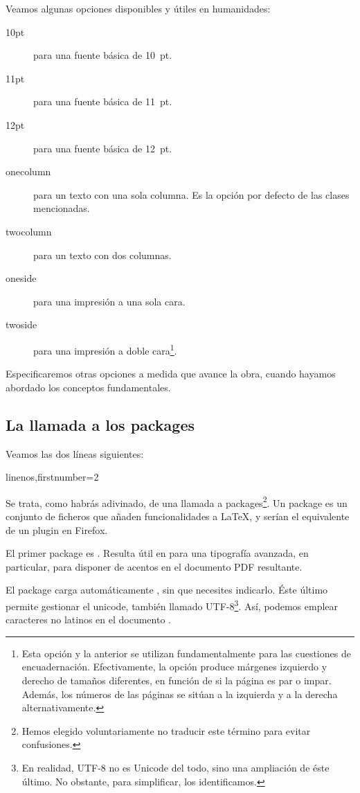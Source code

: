 \label{optionsclasse}

Veamos algunas opciones disponibles y útiles en humanidades:

\begin{description}
\item[10pt] para una fuente básica de 10~pt.
\item[11pt] para una fuente básica de 11~pt.
\item[12pt] para una fuente básica de 12~pt.
\item[onecolumn] para un texto con una sola columna. Es la opción por defecto de las clases mencionadas.
\item[twocolumn] para un texto con dos columnas.
\item[oneside] para una impresión a una sola cara. \label{nbsides}
\item[twoside] para una impresión a doble cara\footnote{Esta opción y la anterior se utilizan fundamentalmente para las cuestiones de encuadernación. Efectivamente, la opción  produce márgenes izquierdo y derecho de tamaños diferentes, en función de si la página es par o impar. Además, los números de las páginas se sitúan a la izquierda y a la derecha alternativamente.}.\label{rectoverso}
\end{description}

Especificaremos otras opciones a medida que avance la obra, cuando hayamos abordado los conceptos fundamentales.

\subsection{La llamada a los packages}

Veamos las dos líneas siguientes: 

\begin{latexcode*}{linenos,firstnumber=2}
\usepackage{fontspec}
\usepackage{polyglossia}
\end{latexcode*}

Se trata, como habrás adivinado, de una llamada a packages\footnote{Hemos elegido voluntariamente no traducir este término para evitar confusiones.}. Un package es un conjunto de ficheros que añaden funcionalidades a \LaTeX, y serían el equivalente de un  plugin en Firefox. 

El primer package es . Resulta útil en \XeLaTeX  para una tipografía avanzada, en particular, para disponer de acentos en el documento PDF resultante. 

El package  carga automáticamente , sin que necesites indicarlo. Éste último permite gestionar el unicode, también llamado UTF-8\footnote{En realidad, UTF-8 no es Unicode del todo, sino una ampliación de éste último. No obstante, para simplificar, los identificamos.}. Así, podemos emplear caracteres no latinos en el documento .

